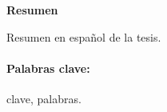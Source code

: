 \clearpage 
{}  %

\thispagestyle{empty}
\begin{center}
	\setlength{\parskip}{0pt}
	\bigskip
	{\begin{flushleft}
			\sf \centering \textbf{\large{Resumen}}
		\end{flushleft} \par}
	\bigskip
\end{center}

\sf 
Resumen en español de la tesis.

\paragraph{Palabras clave:} clave, palabras.